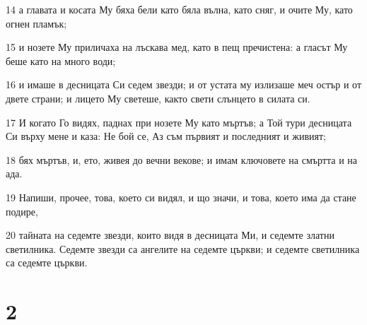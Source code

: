 \par 14 а главата и косата Му бяха бели като бяла вълна, като сняг, и очите Му, като огнен пламък;
\par 15 и нозете Му приличаха на лъскава мед, като в пещ пречистена: а гласът Му беше като на много води;
\par 16 и имаше в десницата Си седем звезди; и от устата му излизаше меч остър и от двете страни; и лицето Му светеше, както свети слънцето в силата си.
\par 17 И когато Го видях, паднах при нозете Му като мъртъв; а Той тури десницата Си върху мене и каза: Не бой се, Аз съм първият и последният и живият;
\par 18 бях мъртъв, и, ето, живея до вечни векове; и имам ключовете на смъртта и на ада.
\par 19 Напиши, прочее, това, което си видял, и що значи, и това, което има да стане подире,
\par 20 тайната на седемте звезди, които видя в десницата Ми, и седемте златни светилника. Седемте звезди са ангелите на седемте църкви; и седемте светилника са седемте църкви.

\chapter{2}

